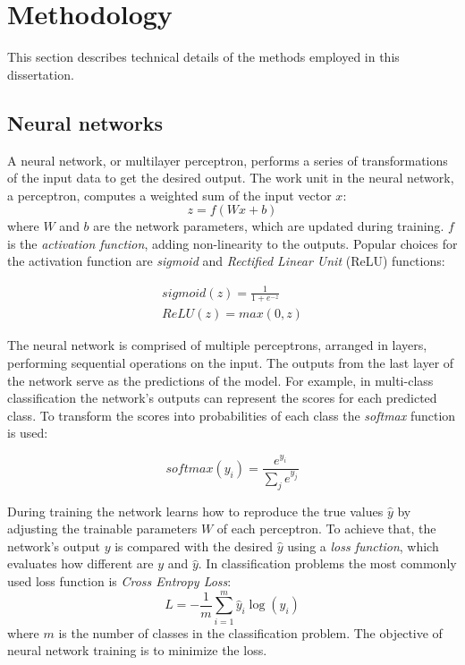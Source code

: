 \section{Methodology}

This section describes technical details of the methods employed in this dissertation.

\subsection{Neural networks}
A neural network, or multilayer perceptron, performs a series of transformations of the input data to get the desired output. The work unit in the neural network, a perceptron, computes a weighted sum of the input vector $x$:
\begin{equation}
    z = f(Wx + b)
\end{equation}
where $W$ and $b$ are the network parameters, which are updated during training. $f$ is the \textit{activation function}, adding non-linearity to the outputs. Popular choices for the activation function are \textit{sigmoid} and \textit{Rectified Linear Unit} (ReLU) functions:

\begin{align}
    sigmoid(z) = \frac{1}{1+e^{-z}} \\
    ReLU(z) = max(0, z) 
\end{align}

The neural network is comprised of multiple perceptrons, arranged in layers, performing sequential operations on the input. The outputs from the last layer of the network serve as the predictions of the model. For example, in multi-class classification the network's outputs can represent the scores for each predicted class. To transform the scores into probabilities of each class the \textit{softmax} function is used:

\begin{equation}
   softmax(y_i) = \frac{e^{y_i}}{\sum_j e^{y_j}}
\end{equation}

During training the network learns how to reproduce the true values $\hat{y}$ by adjusting the trainable parameters $W$ of each perceptron. To achieve that, the network's output $y$ is compared with the desired $\hat{y}$ using a \textit{loss function}, which evaluates how different are $y$ and $\hat{y}$. In classification problems the most commonly used loss function is \textit{Cross Entropy Loss}:
\begin{equation}
    L = - \frac{1}{m}\sum_{i=1}^m \hat{y}_i \log(y_i)
\end{equation}
where $m$ is the number of classes in the classification problem. The objective of neural network training is to minimize the loss.

